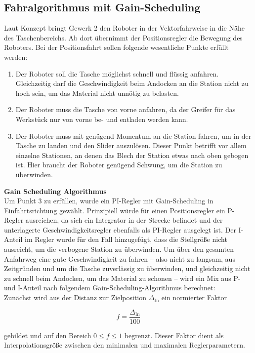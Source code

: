 \subsection{Fahralgorithmus mit Gain-Scheduling}
Laut Konzept bringt Gewerk 2 den Roboter in der Vektorfahrweise in die Nähe des Taschenbereichs. Ab dort übernimmt der Positionsregler die Bewegung des Roboters. Bei der Positionsfahrt sollen folgende wesentliche Punkte erfüllt werden:

\begin{enumerate}
    \item Der Roboter soll die Tasche möglichst schnell und flüssig anfahren. Gleichzeitig darf die Geschwindigkeit beim Andocken an die Station nicht zu hoch sein, um das Material nicht unnötig zu belasten.
    \item Der Roboter muss die Tasche von vorne anfahren, da der Greifer für das Werkstück nur von vorne be- und entladen werden kann.
    \item Der Roboter muss mit genügend Momentum an die Station fahren, um in der Tasche zu landen und den Slider auszulösen. Dieser Punkt betrifft vor allem einzelne Stationen, an denen das Blech der Station etwas nach oben gebogen ist. Hier braucht der Roboter genügend Schwung, um die Station zu überwinden.
\end{enumerate}

\noindent \textbf{Gain Scheduling Algorithmus}\\
Um Punkt 3 zu erfüllen, wurde ein PI-Regler mit Gain-Scheduling in Einfahrtsrichtung gewählt. Prinzipiell würde für einen Positionsregler ein P-Regler ausreichen, da sich ein Integrator in der Strecke befindet und der unterlagerte Geschwindigkeitsregler ebenfalls als PI-Regler ausgelegt ist. Der I-Anteil im Regler wurde für den Fall hinzugefügt, dass die Stellgröße nicht ausreicht, um die verbogene Station zu überwinden. Um über den gesamten Anfahrweg eine gute Geschwindigkeit zu fahren – also nicht zu langsam, aus Zeitgründen und um die Tasche zuverlässig zu überwinden, und gleichzeitig nicht zu schnell beim Andocken, um das Material zu schonen – wird ein Mix aus P- und I-Anteil nach folgendem Gain-Scheduling-Algorithmus berechnet:\\

\noindent Zunächst wird aus der Distanz zur Zielposition $\Delta_\mathrm{In}$ ein normierter Faktor

\[
f = \frac{\Delta_\mathrm{In}}{100}
\]

gebildet und auf den Bereich $0 \leq f \leq 1$ begrenzt. Dieser Faktor dient als Interpolationsgröße zwischen den minimalen und maximalen Reglerparametern.

